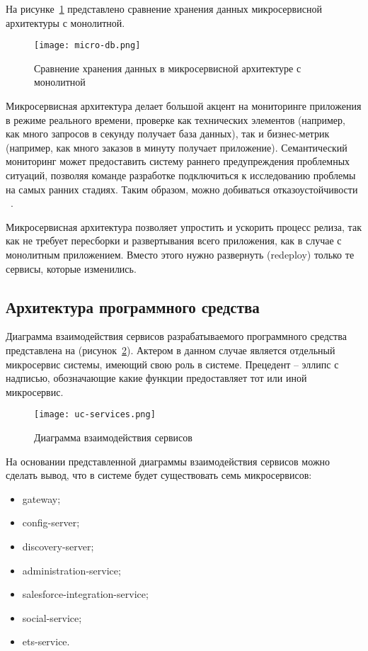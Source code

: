 На рисунке~\ref{fig:micro-db} представлено сравнение хранения данных микросервисной архитектуры с монолитной.

\begin{figure}[ht]
\centering
  \texttt{[image: micro-db.png]}  
  \caption{Сравнение хранения данных в микросервисной архитектуре с монолитной}
	\label{fig:micro-db}
\end{figure} 



Микросервисная архитектура делает большой акцент на мониторинге приложения в режиме реального времени, проверке как технических элементов (например, как много запросов в секунду получает база данных), так и бизнес-метрик (например, как много заказов в минуту получает приложение). Семантический мониторинг может предоставить систему раннего предупреждения проблемных ситуаций, позволяя команде разработке подключиться к исследованию проблемы на самых ранних стадиях. Таким образом, можно добиваться отказоустойчивости ~\cite{micro}.

Микросервисная архитектура позволяет упростить и ускорить процесс релиза, так как не требует пересборки и развертывания всего приложения, как в случае с монолитным приложением. Вместо этого нужно развернуть (redeploy) только те сервисы, которые изменились.



\subsection{Архитектура программного средства}
\label{sub:design:ps}


Диаграмма взаимодействия сервисов разрабатываемого программного средства представлена на (рисунок~\ref{fig:uc-services}). Актером в данном случае является отдельный микросервис системы, имеющий свою роль в системе. Прецедент – эллипс с надписью, обозначающие какие функции предоставляет тот или иной микросервис.

\begin{figure}[ht]
\centering
  \texttt{[image: uc-services.png]}  
  \caption{Диаграмма взаимодействия сервисов}
	\label{fig:uc-services}
\end{figure} 

На основании представленной диаграммы взаимодействия сервисов можно сделать вывод, что в системе будет существовать семь микросервисов:
\begin{itemize}
\item gateway;
\item config-server;
\item discovery-server;
\item administration-service;
\item salesforce-integration-service;
\item social-service;
\item ets-service.
\end{itemize}
 
